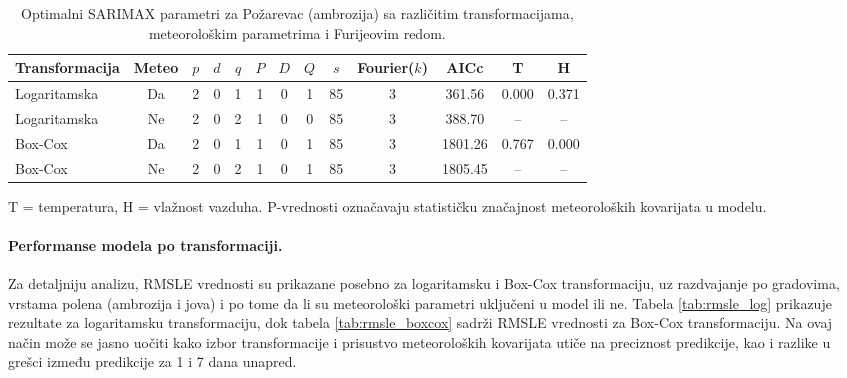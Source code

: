 \documentclass[12pt]{article}
\begin{document}
\renewcommand{\arraystretch}{1.3}

\begin{table}[h!]
    \label{tab:sarimax_params}
\centering
\caption{Optimalni SARIMAX parametri za Požarevac (ambrozija) sa različitim transformacijama, meteorološkim parametrima i Furijeovim redom.}


\begin{tabular}{|l|c|c|c|c|c|c|c|c|c|c|c|c|}
\hline
\textbf{Transformacija} & \textbf{Meteo} & $p$ & $d$ & $q$ & $P$ & $D$ & $Q$ & $s$ & \textbf{Fourier($k$)} & AICc & \textbf{T} & \textbf{H} \\ \hline
Logaritamska    & Da & 2 & 0 & 1 & 1 & 0 & 1 & 85 & 3 & 361.56 & 0.000 & 0.371  \\ \hline
Logaritamska    & Ne & 2 & 0 & 2 & 1 & 0 & 0 & 85 & 3 & 388.70 & -- & -- \\ \hline
Box-Cox & Da & 2 & 0 & 1 & 1 & 0 & 1 & 85 & 3 & 1801.26 & 0.767 & 0.000 \\ \hline
Box-Cox & Ne & 2 & 0 & 2 & 1 & 0 & 1 & 85 & 3 & 1805.45 & -- & -- \\ \hline
\end{tabular}

\vspace{0.2cm}
\footnotesize{T = temperatura, H = vlažnost vazduha. P-vrednosti označavaju statističku značajnost meteoroloških kovarijata u modelu.}
\end{table}

\paragraph{\textbf{Performanse modela po transformaciji.}}  
Za detaljniju analizu, RMSLE vrednosti su prikazane posebno za logaritamsku i Box-Cox transformaciju, uz razdvajanje po gradovima, vrstama polena (ambrozija i jova) i po tome da li su meteorološki parametri uključeni u model ili ne.  
Tabela \ref{tab:rmsle_log} prikazuje rezultate za logaritamsku transformaciju, dok tabela \ref{tab:rmsle_boxcox} sadrži RMSLE vrednosti za Box-Cox transformaciju.  
Na ovaj način može se jasno uočiti kako izbor transformacije i prisustvo meteoroloških kovarijata utiče na preciznost predikcije, kao i razlike u grešci između predikcije za 1 i 7 dana unapred.
\end{document}

